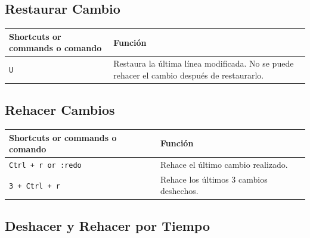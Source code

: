 \documentclass[
  doc,
  floatsintext,
  longtable,
  a4paper,
  nolmodern,
  notxfonts,
  notimes,
  12pt,
  colorlinks=true,linkcolor=blue,citecolor=blue,urlcolor=blue]{apa7}
\newcounter{none} %
\begin{document}
\subsection{Restaurar Cambio}\label{restaurar-cambio}

{\def\LTcaptype{none} %
\begin{longtable}[]{@{}
  >{\raggedright\arraybackslash}p{}
  >{\raggedright\arraybackslash}p{}@{}}
\toprule\noalign{}
\begin{minipage}[b]{\linewidth}\raggedright
Shortcuts or commands o comando
\end{minipage} & \begin{minipage}[b]{\linewidth}\raggedright
Función
\end{minipage} \\
\midrule\noalign{}
\endhead
\bottomrule\noalign{}
\endlastfoot
\texttt{U} & Restaura la última línea modificada. No se puede rehacer el
cambio después de restaurarlo. \\
\end{longtable}
}

\subsection{Rehacer Cambios}\label{rehacer-cambios}

{\def\LTcaptype{none} %
\begin{longtable}[]{@{}
  >{\raggedright\arraybackslash}p{}
  >{\raggedright\arraybackslash}p{}@{}}
\toprule\noalign{}
\begin{minipage}[b]{\linewidth}\raggedright
Shortcuts or commands o comando
\end{minipage} & \begin{minipage}[b]{\linewidth}\raggedright
Función
\end{minipage} \\
\midrule\noalign{}
\endhead
\bottomrule\noalign{}
\endlastfoot
\texttt{Ctrl\ +\ r\ or\ :redo} & Rehace el último cambio realizado. \\
\texttt{3\ +\ Ctrl\ +\ r} & Rehace los últimos 3 cambios deshechos. \\
\end{longtable}
}

\subsection{Deshacer y Rehacer por
Tiempo}\label{deshacer-y-rehacer-por-tiempo}
\end{document}
